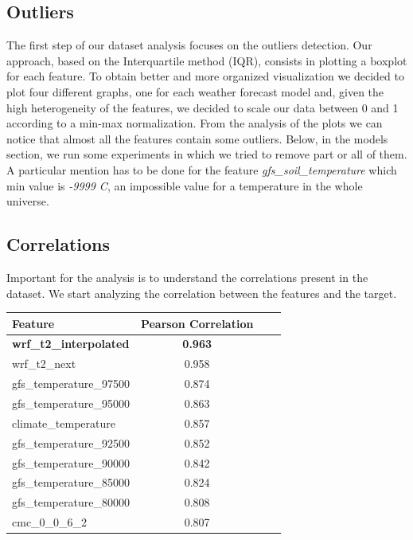 \documentclass[letterpaper, 10 pt, conference]{ieeeconf}
\begin{document}
    \subsection{Outliers}
    The first step of our dataset analysis focuses on the outliers detection. Our approach, based on the Interquartile method (IQR), consists in plotting a boxplot for each feature. To obtain better and more organized visualization we decided to plot four different graphs, one for each weather forecast model and, given the high heterogeneity of the features, we decided to scale our data between 0 and 1 according to a min-max normalization.
    From the analysis of the plots we can notice that almost all the features contain some outliers. Below, in the models section, we run some experiments in which we tried to remove part or all of them. A particular mention has to be done for the feature \textit{gfs\_soil\_temperature} which min value is \textit{-9999 C}, an impossible value for a temperature in the whole universe.
    \subsection{Correlations}
    Important for the analysis is to understand the correlations present in the dataset. We start analyzing the correlation between the features and the target. 
    
\setlength{\tabcolsep}{3em}
\begin{table}
\begin{center}
\begin{tabular}{lccl}
\toprule
Feature                         & Pearson Correlation \\ \midrule
\textbf{wrf\_t2\_interpolated}   & \textbf{0.963}     \\
wrf\_t2\_next                   & 0.958               \\
gfs\_temperature\_97500         & 0.874               \\
gfs\_temperature\_95000         & 0.863               \\
climate\_temperature            & 0.857               \\
gfs\_temperature\_92500         & 0.852               \\
gfs\_temperature\_90000         & 0.842               \\
gfs\_temperature\_85000         & 0.824               \\
gfs\_temperature\_80000         & 0.808               \\
cmc\_0\_0\_6\_2                 & 0.807               \\ \bottomrule
\end{tabular}
\end{center}
\end{table}
    
\end{document}
